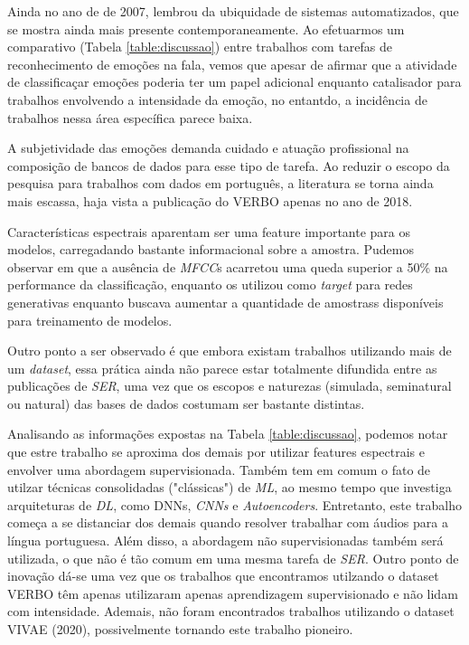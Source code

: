 Ainda no ano de de 2007, \cite{32.32} lembrou da ubiquidade de sistemas automatizados, que se mostra ainda mais presente contemporaneamente. Ao efetuarmos um comparativo (Tabela \ref{table:discussao}) entre trabalhos com tarefas de reconhecimento de emoções na fala, vemos que apesar de \cite{14} afirmar que a atividade de classificaçar emoções poderia ter um papel adicional enquanto catalisador para trabalhos envolvendo a intensidade da emoção, no entantdo, a incidência de trabalhos nessa área específica parece baixa.

A subjetividade das emoções demanda cuidado e atuação profissional na composição de bancos de dados para esse tipo de tarefa. Ao reduzir o escopo da pesquisa para trabalhos com dados em português, a literatura se torna ainda mais escassa, haja vista a publicação do VERBO apenas no ano de 2018.

Características espectrais aparentam ser uma feature importante para os modelos, carregadando bastante informacional sobre a amostra. Pudemos observar em \cite{11} que a ausência de \textit{MFCC}s acarretou uma queda superior a 50\% na performance da classificação, enquanto \cite{34} os utilizou como \textit{target} para redes generativas enquanto buscava aumentar a quantidade de amostrass disponíveis para treinamento de modelos.

Outro ponto a ser observado é que embora existam trabalhos utilizando mais de um \textit{dataset}, essa prática ainda não parece estar totalmente difundida entre as publicações de \textit{SER}, uma vez que os escopos e naturezas (simulada, seminatural ou natural) das bases de dados costumam ser bastante distintas.

Analisando as informações expostas na Tabela \ref{table:discussao}, podemos notar que estre trabalho se aproxima dos demais por utilizar features espectrais e envolver uma abordagem supervisionada. Também tem em comum o fato de utilzar técnicas consolidadas ("clássicas") de \textit{ML}, ao mesmo tempo que investiga arquiteturas de \textit{DL}, como DNNs, \textit{CNNs} e \textit{Autoencoders}. Entretanto, este trabalho começa a se distanciar dos demais quando resolver trabalhar com áudios para a língua portuguesa. Além disso, a abordagem não supervisionadas também será utilizada, o que não é tão comum em uma mesma tarefa de \textit{SER}. Outro ponto de inovação dá-se uma vez que os trabalhos que encontramos utilzando o dataset VERBO têm apenas utilizaram apenas aprendizagem supervisionado e não lidam com intensidade. Ademais, não foram encontrados trabalhos utilizando o dataset VIVAE (2020), possivelmente tornando este trabalho pioneiro.

